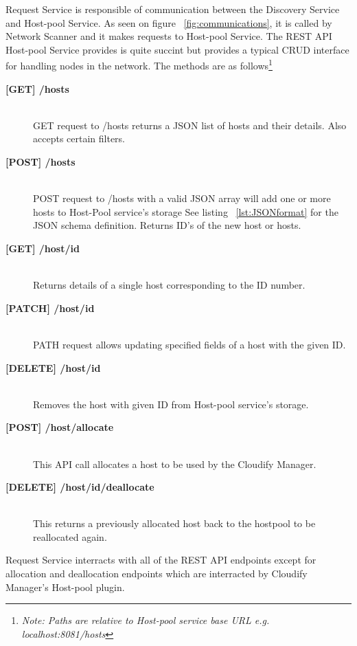 Request Service is responsible of communication between the Discovery Service and Host-pool Service. As seen on figure ~\ref{fig:communications}, it is called by Network Scanner and it makes requests to Host-pool Service. The REST API Host-pool Service provides is quite succint but provides a typical CRUD interface for handling nodes in the network. The methods are as follows\footnote{\textit{Note: Paths are relative to Host-pool service base URL e.g. localhost:8081/hosts}} 

\begin{description}

\item[\textbf{[GET] /hosts}] \hfill \\
GET request to /hosts returns a JSON list of hosts and their details. Also accepts certain filters.

\item[\textbf{[POST] /hosts}] \hfill \\
POST request to /hosts with a valid JSON array will add one or more hosts to Host-Pool service's storage See listing ~\ref{lst:JSONformat} for the JSON schema definition. Returns ID's of the new host or hosts.

\item[\textbf{[GET] /host/{id}}] \hfill \\
Returns details of a single host corresponding to the ID number.

\item[\textbf{[PATCH] /host/{id}}] \hfill \\
PATH request allows updating specified fields of a host with the given ID.

\item[\textbf{[DELETE] /host/{id}}] \hfill \\
Removes the host with given ID from Host-pool service's storage.

\item[\textbf{[POST] /host/allocate}] \hfill \\
This API call allocates a host to be used by the Cloudify Manager.

\item[\textbf{[DELETE] /host/{id}/deallocate}] \hfill \\
This returns a previously allocated host back to the hostpool to be reallocated again.

\end{description}

Request Service interracts with all of the REST API endpoints except for allocation and deallocation endpoints which are interracted by Cloudify Manager's Host-pool plugin.


